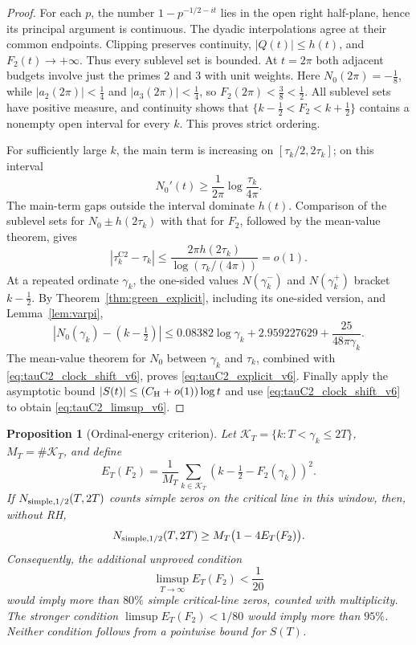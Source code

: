\documentclass[11pt,reqno]{amsart}
\numberwithin{equation}{section}
\newtheorem{proposition}[theorem]{Proposition}
\theoremstyle{definition}
\theoremstyle{remark}
\newcommand{\GreenC}{2.959227629}
\newcommand{\GreenA}{0.08382}
\begin{document}
\begin{proof}
For each $p$, the number $1-p^{-1/2-it}$ lies in the open
right half-plane, hence its principal argument is continuous.
The dyadic interpolations agree at their common endpoints.
Clipping preserves continuity, $|Q(t)|\le h(t)$, and
$F_2(t)\to+\infty$. Thus every sublevel set is bounded.
At $t=2\pi$ both adjacent budgets involve just the primes
$2$ and $3$ with unit weights.
Here $N_0(2\pi)=-\frac18$, while
$|a_2(2\pi)|<\frac14$ and $|a_3(2\pi)|<\frac14$,
so $F_2(2\pi)<\frac38<\frac12$.
All sublevel sets have positive measure, and continuity shows
that $\{k-\frac12<F_2<k+\frac12\}$ contains a nonempty
open interval for every $k$. This proves strict ordering.

For sufficiently large $k$, the main term is increasing on
$[\tau_k/2,2\tau_k]$; on this interval
\[
 N_0'(t)\ge\frac1{2\pi}\log\frac{\tau_k}{4\pi}.
\]
The main-term gaps outside the interval dominate $h(t)$.
Comparison of the sublevel sets for $N_0\pm h(2\tau_k)$
with that for $F_2$, followed by the mean-value theorem, gives
\begin{equation}
 |\tau_k^{\mathrm{C2}}-\tau_k|
 \le\frac{2\pi h(2\tau_k)}{\log(\tau_k/(4\pi))}
 =o(1).
 \label{eq:tauC2_clock_shift_v6}
\end{equation}
At a repeated ordinate $\gamma_k$, the one-sided values
$N(\gamma_k^-)$ and $N(\gamma_k^+)$ bracket $k-\frac12$.
By Theorem~\ref{thm:green_explicit}, including its one-sided
version, and Lemma~\ref{lem:varpi},
\[
 |N_0(\gamma_k)-(k-\tfrac12)|
 \le\GreenA\log\gamma_k+\GreenC
        +\frac{25}{48\pi\gamma_k}.
\]
The mean-value theorem for $N_0$ between $\gamma_k$ and
$\tau_k$, combined with \eqref{eq:tauC2_clock_shift_v6},
proves \eqref{eq:tauC2_explicit_v6}. Finally apply the
asymptotic bound $|S(t)|\le(C_{\rm H}+o(1))\log t$
and use \eqref{eq:tauC2_clock_shift_v6} to obtain
\eqref{eq:tauC2_limsup_v6}.
\end{proof}

\begin{proposition}[Ordinal-energy criterion]
\label{prop:tauC2_energy_v6}
Let $\mathcal K_T=\{k:T<\gamma_k\le2T\}$,
$M_T=\#\mathcal K_T$, and define
\[
 E_T(F_2)=\frac1{M_T}\sum_{k\in\mathcal K_T}
 \left(k-\tfrac12-F_2(\gamma_k)\right)^2.
\]
If $N_{\rm simple,1/2}(T,2T)$ counts simple zeros
on the critical line in this window, then, without RH,
\begin{equation}
 N_{\rm simple,1/2}(T,2T)
 \ge M_T\bigl(1-4E_T(F_2)\bigr).
 \label{eq:tauC2_count_v6}
\end{equation}
Consequently, the additional \emph{unproved} condition
\[
 \limsup_{T\to\infty} E_T(F_2)<\frac1{20}
\]
would imply more than $80\%$ simple critical-line zeros,
counted with multiplicity. The stronger condition
$\limsup E_T(F_2)<1/80$ would imply more than $95\%$.
Neither condition follows from a pointwise bound for $S(T)$.
\end{proposition}
\end{document}
